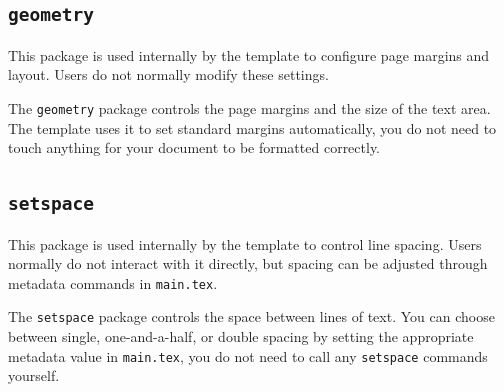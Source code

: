 	\subsection{\texttt{geometry}}
	\noindent\colorbox{themecolour!15}{\parbox{\linewidth}{\small This package is used internally by the template to configure page margins and layout. Users do not normally modify these settings.}}\vspace{0.5\baselineskip}
	
	The \texttt{geometry} package controls the page margins and the size of the text area. The template uses it to set standard margins automatically, you do not need to touch anything for your document to be formatted correctly.
	
	\subsection{\texttt{setspace}}
	\noindent\colorbox{themecolour!15}{\parbox{\linewidth}{\small This package is used internally by the template to control line spacing. Users normally do not interact with it directly, but spacing can be adjusted through metadata commands in \texttt{main.tex}.}}\vspace{0.5\baselineskip}
	
	The \texttt{setspace} package controls the space between lines of text. You can choose between single, one-and-a-half, or double spacing by setting the appropriate metadata value in \texttt{main.tex}, you do not need to call any \texttt{setspace} commands yourself.
	
